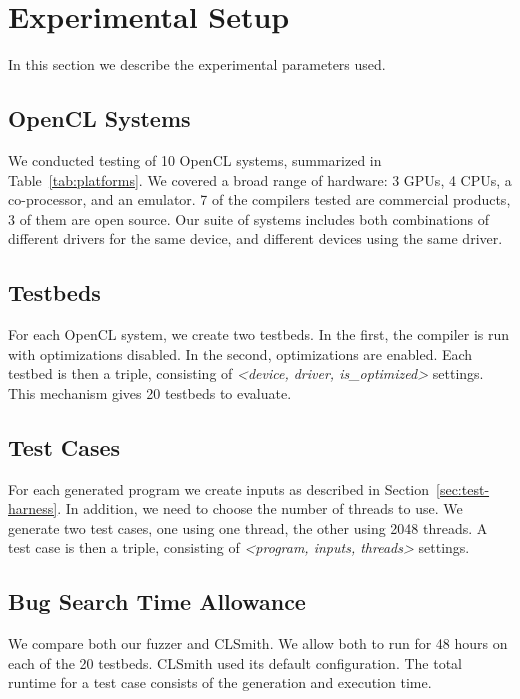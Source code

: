 \section{Experimental Setup}

In this section we describe the experimental parameters used.

\subsection{OpenCL Systems}

We conducted testing of 10 OpenCL systems, summarized in
Table~\ref{tab:platforms}. We covered a broad range of hardware: 3 GPUs, 4
CPUs, a co-processor, and an emulator. 7 of the compilers tested are commercial
products, 3 of them are open source. Our suite of systems includes both
combinations of different drivers for the same device, and different devices
using the same driver.

\subsection{Testbeds}

For each OpenCL system, we create two testbeds. In the first, the compiler is
run with optimizations disabled. In the second, optimizations are enabled. Each
testbed is then a triple, consisting of \emph{<device, driver, is\_optimized>}
settings. This mechanism gives 20 testbeds to evaluate.


\subsection{Test Cases}

For each generated program we create inputs as described in
Section~\ref{sec:test-harness}. In addition, we need to choose the number of
threads to use. We generate two test cases, one using one thread, the other
using 2048 threads. A test case is then a triple, consisting of \emph{<program,
inputs, threads>} settings.

\subsection{Bug Search Time Allowance}

We compare both our fuzzer and CLSmith. We allow both to run for 48 hours on
each of the 20 testbeds. CLSmith used its default configuration. The total
runtime for a test case consists of the generation and execution time.
